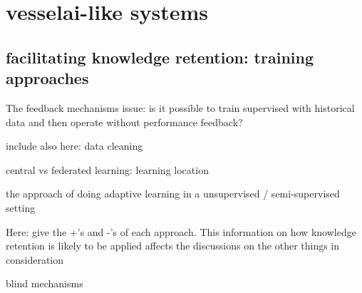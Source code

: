 




%
%



\chapter{vesselai-like systems}

\section{facilitating knowledge retention: training approaches}

The feedback mechanisms issue: is it possible to train supervised with historical data and then operate without performance feedback?

include also here: data cleaning

central vs federated learning: learning location

the approach of doing adaptive learning in a unsupervised / semi-supervised setting

Here: give the +'s and -'s of each approach. This information on how knowledge retention is likely to be applied affects the discussions on the other things in consideration

blind mechanisms

